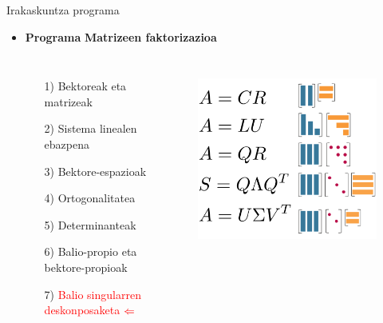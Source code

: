 \documentclass[
 10pt,%
 compress,%
 t,       %
 xcolor=svgnames
]{beamer}
\theoremstyle{definition} \newtheorem{definicion}{Definicion}[section]
\theoremstyle{propiedades} \newtheorem{propiedades}{Propiedades}[section]
\begin{document}





\begin{frame}{Irakaskuntza programa}
	
	
	\medskip
	\small
	
	\begin{itemize}
		
		
		\item  \textbf{Programa} \hspace*{4.5cm}  \textbf{Matrizeen faktorizazioa}	  
%
%
\begin{columns}
	
	
	\begin{itemize}
		\item[1)] Bektoreak eta matrizeak
		\item[2)] Sistema linealen ebazpena
		\item[3)] Bektore-espazioak
		\item[4)] Ortogonalitatea
		\item[5)] Determinanteak
		\item[6)] Balio-propio eta bektore-propioak
		\item[7)] \textcolor{red}{Balio singularren deskonposaketa} $\color{red}\Leftarrow$
	\end{itemize}
	
	
	\begin{figure}
		\centering
		\begin{minipage}{.9\textwidth}
			\colorbox{white}  {\includegraphics[width=0.9\linewidth]{Matrize_Deskonposaketa}}
		\end{minipage}
	\end{figure}
	

\end{columns}
\end{itemize}
\end{frame}
\end{document}
